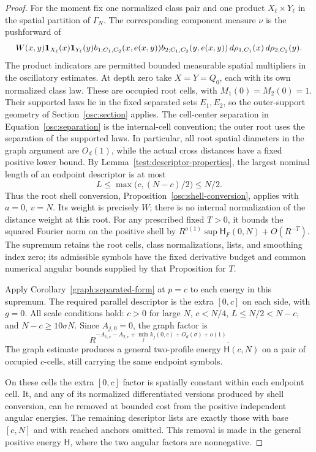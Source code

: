 \begin{proof}
For the moment fix one normalized class pair and one product
$X_\ell\times Y_\ell$ in the spatial partition of $\Gamma_N$.
The corresponding component measure $\nu$ is the pushforward of
\[
 W(x,y)\mathbf 1_{X_\ell}(x)\mathbf 1_{Y_\ell}(y)
 b_{1;C_1,C_2}(x,e(x,y))b_{2;C_1,C_2}(y,e(x,y))
             \,d\rho_{1,C_1}(x)\,d\rho_{2,C_2}(y).
\]
The product indicators are permitted bounded measurable spatial
multipliers in the oscillatory estimates.  At depth zero take
$X=Y=Q_0$, each with its own normalized class law.  These are occupied
root cells, with $M_1(0)=M_2(0)=1$.  Their supported laws lie in the
fixed separated sets $E_1,E_2$, so the outer-support geometry of
Section~\ref{osc:section} applies.  The cell-center separation in
Equation~\eqref{osc:separation} is the internal-cell convention; the
outer root uses the separation of the supported laws.  In particular,
all root spatial diameters in the graph argument are $O_d(1)$, while
the actual cross distances have a fixed positive lower bound.
By
Lemma~\ref{test:descriptor-properties}, the largest nominal length
of an endpoint descriptor is at most
\[
 L\le\max\bigl(c,(N-c)/2\bigr)\le N/2.
\]
Thus the root shell conversion, Proposition~\ref{osc:shell-conversion},
applies with $a=0$, $v=N$.  Its weight is precisely $W$; there is no
internal normalization of the distance weight at this root.  For any
prescribed fixed $T>0$, it bounds the squared Fourier norm on the positive
shell by $R^{o(1)}\sup\mathsf H_F(0,N)+O(R^{-T})$.  The supremum retains
the root cells, class normalizations, lists, and smoothing index zero;
its admissible symbols have the fixed derivative budget and common
numerical angular bounds supplied by that Proposition for $T$.

Apply Corollary~\ref{graph:separated-form} at $p=c$ to each energy in this
supremum.  The required parallel
descriptor is the extra $[0,c]$ on each side, with $g=0$.  All scale
conditions hold: $c>0$ for large $N$, $c<N/4$,
$L\le N/2<N-c$, and $N-c\ge10\sigma N$.  Since $A_{j,0}=0$, the
graph factor is
\begin{equation}
 \label{asm:graph-factor}
 R^{-A_{1,c}-A_{2,c}+\min_j k_j(0,c)+O_d(\sigma)+o(1)}.
\end{equation}
The graph estimate produces a general two-profile energy
$\mathsf H(c,N)$ on a pair of occupied $c$-cells, still carrying the
same endpoint symbols.

On these cells the extra $[0,c]$ factor is spatially constant within
each endpoint cell.  It, and any of its normalized differentiated
versions produced by shell conversion, can be removed at bounded
cost from the positive independent angular energies.  The remaining
descriptor lists are exactly those with base $[c,N]$ and with reached
anchors omitted.  This removal is made in the general positive energy
$\mathsf H$, where the two angular factors are nonnegative.


\end{proof}
